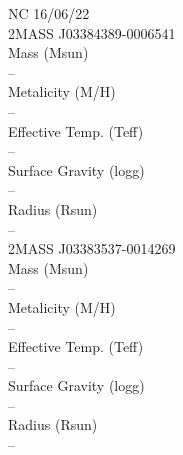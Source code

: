 NC 16/06/22\\
2MASS J03384389-0006541\\

Mass (Msun)\\
--\\
Metalicity (M/H)\\
--\\
Effective Temp. (Teff)\\
--\\
Surface Gravity (logg)\\
--\\
Radius (Rsun)\\
--\\
2MASS J03383537-0014269\\
Mass (Msun)\\
--\\
Metalicity (M/H)\\
--\\
Effective Temp. (Teff)\\
--\\
Surface Gravity (logg)\\
--\\
Radius (Rsun)\\
--\\